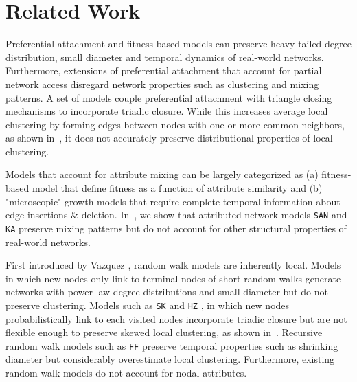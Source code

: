 
\section{Related Work}
\label{sec:Related Work}

Preferential attachment and fitness-based models \cite{bell2017network,medo2011temporal,bianconi2001bose,caldarelli2002scale}
can preserve heavy-tailed degree distribution, small diameter \cite{bollobas2004diameter} and temporal dynamics \cite{wang2013quantifying}
of real-world networks. Furthermore, extensions of preferential attachment \cite{mossa2002truncation,zeng2005construction,wang2009local} that account for
partial network access disregard network properties such as clustering and mixing patterns.
A set of models
\cite{holme2002growing,klemm2002highly,leskovec2008microscopic}
couple preferential attachment with triangle closing mechanisms to incorporate triadic closure.
While this increases {average} local clustering by forming edges between nodes
with one or more common neighbors, as shown in~, it does not
accurately preserve distributional properties of local clustering.


Models \cite{de2013scale,karimi2017visibility,gong2012evolution,zheleva2009co}
that account for attribute mixing can be largely categorized as (a) fitness-based model that define fitness as a function of
attribute similarity and (b) "microscopic" growth models  that require
complete temporal information about edge insertions \& deletion.
In~, we show that attributed network models
\texttt{SAN} and \texttt{KA} preserve mixing patterns but do not account for other
structural properties of real-world networks.

First introduced by Vazquez \cite{vazquez2000knowing}, random walk models are inherently local.
Models \cite{blum2006random} in which
new nodes only link to terminal nodes of short random walks generate
networks with power law degree distributions \cite{chebolu2008pagerank} and
small diameter \cite{mehrabian2016sa} but do not preserve clustering. Models
such as \texttt{SK} \cite{saramaki2004scale}
and \texttt{HZ} \cite{herrera2011generating}, in which new nodes probabilistically link to
each visited nodes incorporate triadic closure but are not flexible enough to preserve
{skewed} local clustering, as shown in~.
Recursive random walk models such as \texttt{FF} \cite{leskovec2005graphs}
preserve temporal properties such as shrinking diameter but considerably overestimate local clustering.
Furthermore, existing random walk models do not account for nodal attributes.

